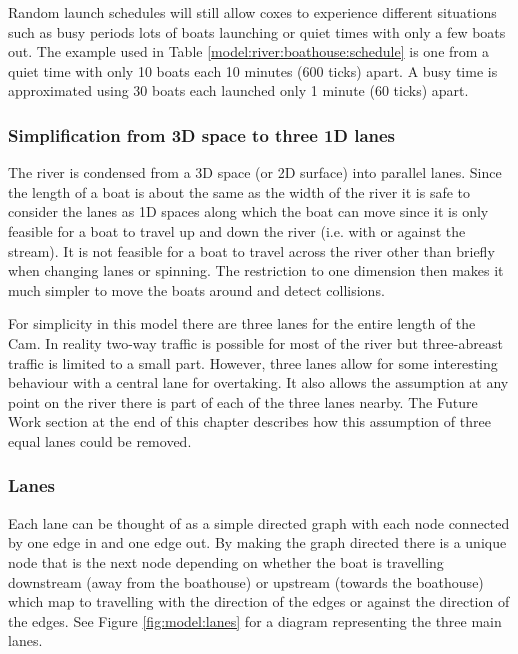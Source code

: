       Random launch schedules will still allow coxes to experience different situations such as busy periods lots of boats launching or quiet times with only a few boats out. The example used in Table \ref{model:river:boathouse:schedule} is one from a quiet time with only 10 boats each 10 minutes (600 ticks) apart. A busy time is approximated using 30 boats each launched only 1 minute (60 ticks) apart.
      
      \subsubsection{Simplification from 3D space to three 1D lanes}
      The river is condensed from a 3D space (or 2D surface) into parallel lanes. Since the length of a boat is about the same as the width of the river it is safe to consider the lanes as 1D spaces along which the boat can move since it is only feasible for a boat to travel up and down the river (i.e. with or against the stream). It is not feasible for a boat to travel across the river other than briefly when changing lanes or spinning. The restriction to one dimension then makes it much simpler to move the boats around and detect collisions.
      
      For simplicity in this model there are three lanes for the entire length of the Cam. In reality two-way traffic is possible for most of the river but three-abreast traffic is limited to a small part. However, three lanes allow for some interesting behaviour with a central lane for overtaking. It also allows the assumption at any point on the river there is part of each of the three lanes nearby. The Future Work section at the end of this chapter describes how this assumption of three equal lanes could be removed.
      
      \subsubsection{Lanes}\label{model:river:lanes}
      Each lane can be thought of as a simple directed graph with each node connected by one edge in and one edge out. By making the graph directed there is a unique node that is the next node depending on whether the boat is travelling downstream (away from the boathouse) or upstream (towards the boathouse) which map to travelling with the direction of the edges or against the direction of the edges. See Figure \ref{fig:model:lanes} for a diagram representing the three main lanes.
      
